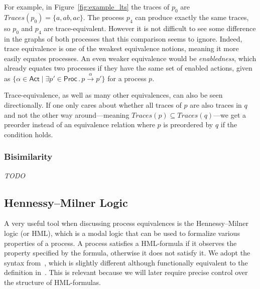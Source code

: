 For example, in Figure~\ref{fig:example_lts} the traces of $p_0$ are
$Traces(p_0) = \{a, ab, ac\}$.
The process $p_4$ can produce exactly the same traces,
so $p_0$ and $p_4$ are trace-equivalent.
However it is not difficult to see some difference in the graphs of both
processes that this comparison seems to ignore.
Indeed, trace equivalence is one of the weakest equivalence notions,
meaning it more easily equates processes.
An even weaker equivalence would be \emph{enabledness},
which already equates two processes
if they have the same set of enabled actions,
given as
$\{\alpha \in \mathsf{Act} \mid
   \exists p' \in \mathsf{Proc}\,.\,p \xrightarrow{\alpha} p'\}$
for a process $p$.

Trace-equivalence, as well as many other equivalences,
can also be seen directionally.
If one only cares about whether all traces of $p$ are also traces in $q$ and
not the other way around---meaning $Traces(p) \subseteq Traces(q)$---we get a
preorder instead of an equivalence relation where $p$ is preordered by $q$
if the condition holds.


\subsubsection{Bisimilarity}

\emph{TODO}


\subsection{Hennessy--Milner Logic}

A very useful tool when discussing process equivalences is the
Hennessy--Milner logic (or HML),
which is a modal logic that can be used to formalize various
properties of a process.
A process satisfies a HML-formula if it observes
the property specified by the formula,
otherwise it does not satisfy it.
We adopt the syntax from~\cite{bisping2023process},
which is slightly different although functionally equivalent to the definition
in~\cite{reactive_systems}.
This is relevant because we will later require precise control over the
structure of HML-formulas.

